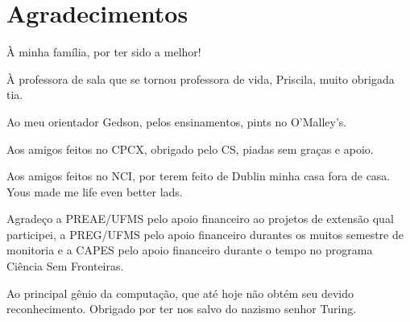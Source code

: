 
\chapter*{Agradecimentos} \label{Cap:Agradecimentos}
À minha família, por ter sido a melhor!

À professora de sala que se tornou professora de vida, Priscila, muito obrigada tia.

Ao meu orientador Gedson, pelos ensinamentos, pints no O'Malley's.

Aos amigos feitos no CPCX, obrigado pelo CS, piadas sem graças e apoio. 

Aos amigos feitos no NCI, por terem feito de Dublin minha casa fora de casa. Yous made me life even better lads.

Agradeço a PREAE/UFMS pelo apoio financeiro ao projetos de extensão qual participei, a PREG/UFMS pelo apoio financeiro durantes os muitos semestre de monitoria e a CAPES pelo apoio financeiro durante o tempo no programa Ciência Sem Fronteiras.

Ao principal gênio da computação, que até hoje não obtém seu devido reconhecimento. Obrigado por ter nos salvo do nazismo senhor Turing.



